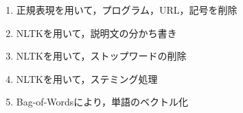 \documentclass[uplatex,dvipdfmx,a4paper,twocolumn,base=11pt,jbase=11pt,ja=standard]{bxjsarticle}  %
\newcommand{\todo}[1]{\colorbox{yellow}{{\bf TODO}:}{\color{red} {\textbf{[#1]}}}}
\begin{document}
\vspace{-2mm}
\begin{enumerate}
    \item 正規表現を用いて，プログラム，URL，記号を削除
    \item NLTKを用いて，説明文の分かち書き
    \item NLTKを用いて，ストップワードの削除
    \item NLTKを用いて，ステミング処理
    \item Bag-of-Wordsにより，単語のベクトル化
\end{enumerate}
\vspace{-5mm}




\end{document}
